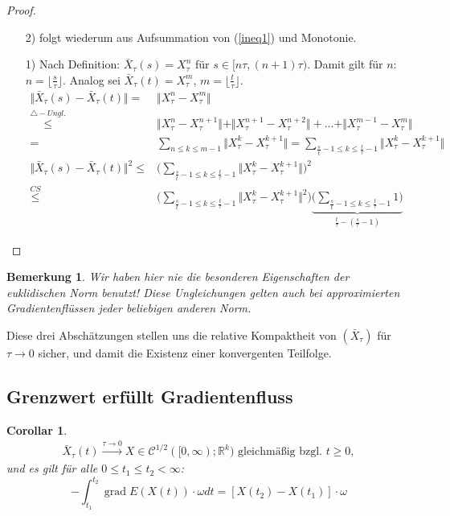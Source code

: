 \documentclass[11pt,a4paper,notitlepage]{scrreprt}
\newcommand{\RR}{\mathbb{R}}
\newcommand{\grad}{\operatorname{grad}}
\newtheorem{cor}[defi]{Corollar}
\newtheorem{bem}[defi]{Bemerkung}
\begin{document}
\begin{proof}
\begin{itemize}
\item[2)] folgt wiederum aus Aufsummation von (\ref{ineq1}) und Monotonie.
\item[1)] Nach Definition: $\bar{X}_\tau(s)=X_\tau^n$ für $s\in [n\tau,(n+1)\tau)$. Damit gilt für $n$: $n=\lfloor \frac{s}{\tau}\rfloor$. Analog sei $\bar{X}_\tau(t)=X_\tau^m$, $m=\lfloor\frac{t}{\tau}\rfloor$.\\
\begin{align*}
\Vert \bar{X}_\tau(s)-\bar{X}_\tau(t)\Vert=&\Vert X_\tau^n-X_\tau^m\Vert \\\overset{\triangle -Ungl.}\leq&\Vert X_\tau^n-X_\tau^{n+1}\Vert+\Vert X_\tau^{n+1}-X_\tau^{n+2}\Vert+...+\Vert X_\tau^{m-1}-X_\tau^m\Vert\\
=&\sum_{n\leq k\leq m-1}\Vert X_\tau^k-X_\tau^{k+1}\Vert=\sum_{\frac{s}{t}-1\leq k\leq \frac{t}{\tau}-1}\Vert X_\tau^k-X_\tau^{k+1}\Vert\\
\Vert \bar{X}_\tau(s)-\bar X_\tau(t)\Vert^2\leq&\Bigg(\sum_{\frac{s}{t}-1\leq k\leq \frac{t}{\tau}-1}\Vert X_\tau^k-X_\tau^{k+1}\Vert\Bigg)^2 \\ \overset{CS}\leq&\Bigg(\sum_{\frac{s}{t}-1\leq k\leq \frac{t}{\tau}-1}\Vert X_\tau^k-X_\tau^{k+1}\Vert^2\Bigg)\underset{\frac{t}{\tau}-(\frac{s}{\tau}-1)}{\underbrace{\Bigg(\sum_{\frac{s}{t}-1\leq k\leq \frac{t}{\tau}-1}1\Bigg)}}
\end{align*}
\end{itemize}
\end{proof}




\begin{bem}
Wir haben hier nie die besonderen Eigenschaften der euklidischen Norm benutzt! Diese Ungleichungen gelten auch bei approximierten Gradientenflüssen jeder beliebigen anderen Norm.
\end{bem}

Diese drei Abschätzungen stellen uns die relative Kompaktheit von $(\bar{X}_\tau)$ für $\tau \to 0$ sicher, und damit die Existenz einer konvergenten Teilfolge.  \\


\subsection{Grenzwert erfüllt Gradientenfluss}
\begin{cor}
\begin{eqnarray*}
\bar{X}_\tau(t) \overset{\tau\to0}{\longrightarrow} X \in \mathcal{C}^{1/2}([0,\infty);\RR^k) \text{ gleichmäßig bzgl. }t\geq 0,
\end{eqnarray*}
und es gilt für alle $0\leq t_1\leq t_2<\infty$:
\begin{equation}
-\int_{t_1}^{t_2}\grad E(X(t))\cdot \omega dt = [X(t_2)-X(t_1)]\cdot\omega
\end{equation}
\end{cor}
\end{document}
